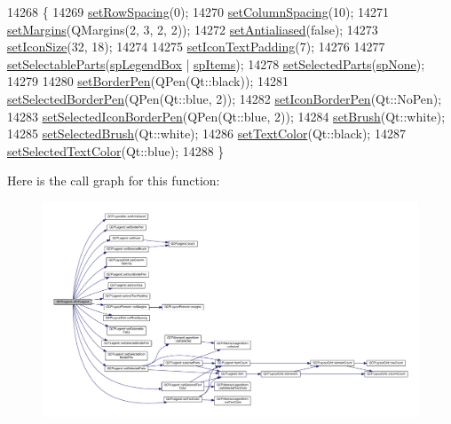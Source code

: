 \begin{DoxyCode}
14268                      \{
14269   \hyperlink{class_q_c_p_layout_grid_aaef2cd2d456197ee06a208793678e436}{setRowSpacing}(0);
14270   \hyperlink{class_q_c_p_layout_grid_a3a49272aba32bb0fddc3bb2a45a3dba0}{setColumnSpacing}(10);
14271   \hyperlink{class_q_c_p_layout_element_a8f450b1f3f992ad576fce2c63d8b79cf}{setMargins}(QMargins(2, 3, 2, 2));
14272   \hyperlink{class_q_c_p_layerable_a4fd43e89be4a553ead41652565ff0581}{setAntialiased}(\textcolor{keyword}{false});
14273   \hyperlink{class_q_c_p_legend_a8b0740cce488bf7010da6beda6898984}{setIconSize}(32, 18);
14274 
14275   \hyperlink{class_q_c_p_legend_a62973bd69d5155e8ea3141366e8968f6}{setIconTextPadding}(7);
14276 
14277   \hyperlink{class_q_c_p_legend_a9ce60aa8bbd89f62ae4fa83ac6c60110}{setSelectableParts}(\hyperlink{class_q_c_p_legend_a5404de8bc1e4a994ca4ae69e2c7072f1a0fa4758962a46fa1dc9da818abae23c4}{spLegendBox} | \hyperlink{class_q_c_p_legend_a5404de8bc1e4a994ca4ae69e2c7072f1a768bfb95f323db4c66473375032c0af7}{spItems});
14278   \hyperlink{class_q_c_p_legend_a2aee309bb5c2a794b1987f3fc97f8ad8}{setSelectedParts}(\hyperlink{class_q_c_p_legend_a5404de8bc1e4a994ca4ae69e2c7072f1a378201c07d500af7126e3ec91652eed7}{spNone});
14279 
14280   \hyperlink{class_q_c_p_legend_a866a9e3f5267de7430a6c7f26a61db9f}{setBorderPen}(QPen(Qt::black));
14281   \hyperlink{class_q_c_p_legend_a2c35d262953a25d96b6112653fbefc88}{setSelectedBorderPen}(QPen(Qt::blue, 2));
14282   \hyperlink{class_q_c_p_legend_a2f2c93d18a651f4ff294bb3f026f49b8}{setIconBorderPen}(Qt::NoPen);
14283   \hyperlink{class_q_c_p_legend_ade93aabe9bcccaf9cf46cec22c658027}{setSelectedIconBorderPen}(QPen(Qt::blue, 2));
14284   \hyperlink{class_q_c_p_legend_a497bbcd38baa3598c08e2b3f48103f23}{setBrush}(Qt::white);
14285   \hyperlink{class_q_c_p_legend_a875227f3219c9799464631dec5e8f1bd}{setSelectedBrush}(Qt::white);
14286   \hyperlink{class_q_c_p_legend_ae1eb239ff4a4632fe1b6c3e668d845c6}{setTextColor}(Qt::black);
14287   \hyperlink{class_q_c_p_legend_a7674dfc7a1f30e1abd1018c0ed45e0bc}{setSelectedTextColor}(Qt::blue);
14288 \}
\end{DoxyCode}


Here is the call graph for this function\+:\nopagebreak
\begin{figure}[H]
\begin{center}
\leavevmode
\includegraphics[width=350pt]{class_q_c_p_legend_a0001a456989bd07ea378883651fabd72_cgraph}
\end{center}
\end{figure}


